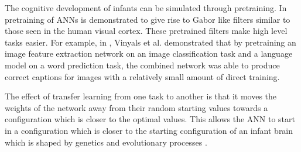 The cognitive development of infants can be simulated through pretraining. In \cite{lee2008sparse} pretraining of \acp{ANN} is demonstrated to give rise to Gabor like filters similar to those seen in the human visual cortex. These pretrained filters make high level tasks easier. For example, in \cite{vinyals2015show}, Vinyals et al. demonstrated that by pretraining an image feature extraction network on an image classification task and a language model on a word prediction task, the combined network was able to produce correct captions for images with a  relatively small amount of direct training. 

The effect of transfer learning from one task to another is that it moves the weights of the network away from their random starting values towards a configuration which is closer to the optimal values. This allows the \ac{ANN} to start in a configuration which is closer to the starting configuration of an infant brain which is shaped by genetics and evolutionary processes \cite{barsalou2008grounded}.



